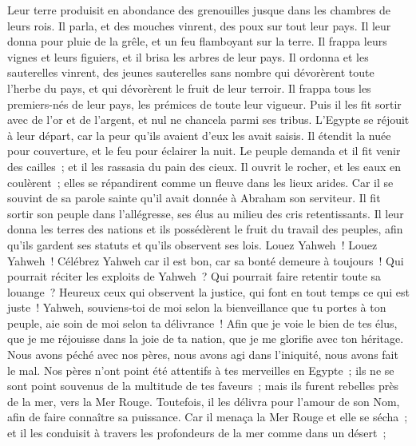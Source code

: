 \begin{multicols}{2}
Leur terre produisit en abondance des grenouilles jusque dans les chambres de leurs rois.
Il parla, et des mouches vinrent, des poux sur tout leur pays.
Il leur donna pour pluie de la grêle, et un feu flamboyant sur la terre.
Il frappa leurs vignes et leurs figuiers, et il brisa les arbres de leur pays.
Il ordonna et les sauterelles vinrent, des jeunes sauterelles sans nombre
qui dévorèrent toute l'herbe du pays, et qui dévorèrent le fruit de leur terroir.
Il frappa tous les premiers-nés de leur pays, les prémices de toute leur vigueur.
Puis il les fit sortir avec de l'or et de l'argent, et nul ne chancela parmi ses tribus.
L'Egypte se réjouit à leur départ, car la peur qu'ils avaient d'eux les avait saisis.
Il étendit la nuée pour couverture, et le feu pour éclairer la nuit.
Le peuple demanda et il fit venir des cailles~; et il les rassasia du pain des cieux.
Il ouvrit le rocher, et les eaux en coulèrent~; elles se répandirent comme un fleuve dans les lieux arides.
Car il se souvint de sa parole sainte qu'il avait donnée à Abraham son serviteur.
Il fit sortir son peuple dans l'allégresse, ses élus au milieu des cris retentissants.
Il leur donna les terres des nations et ils possédèrent le fruit du travail des peuples,
afin qu'ils gardent ses statuts et qu'ils observent ses lois. Louez Yahweh~!
\VerseOne{}Louez Yahweh~! Célébrez Yahweh car il est bon, car sa bonté demeure à toujours~!
Qui pourrait réciter les exploits de Yahweh~? Qui pourrait faire retentir toute sa louange~?
Heureux ceux qui observent la justice, qui font en tout temps ce qui est juste~!
Yahweh, souviens-toi de moi selon la bienveillance que tu portes à ton peuple, aie soin de moi selon ta délivrance~!
Afin que je voie le bien de tes élus, que je me réjouisse dans la joie de ta nation, que je me glorifie avec ton héritage.
Nous avons péché avec nos pères, nous avons agi dans l'iniquité, nous avons fait le mal.
Nos pères n'ont point été attentifs à tes merveilles en Egypte~; ils ne se sont point souvenus de la multitude de tes faveurs~; mais ils furent rebelles près de la mer, vers la Mer Rouge.
Toutefois, il les délivra pour l'amour de son Nom, afin de faire connaître sa puissance.
Car il menaça la Mer Rouge et elle se sécha~; et il les conduisit à travers les profondeurs de la mer comme dans un désert~;

\end{multicols}
